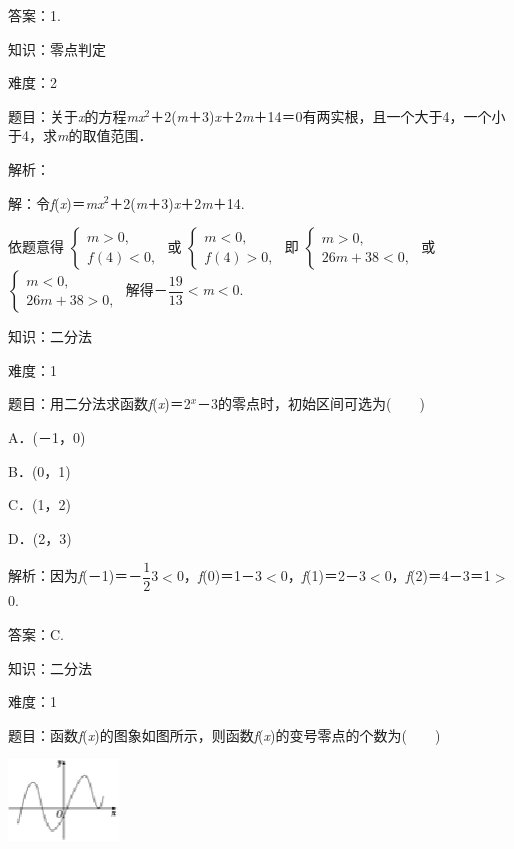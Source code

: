\documentclass{article} %
\begin{document}
答案：1.

知识：零点判定

难度：2

题目：关于\textit{x}的方程\textit{mx}${}^{2}$＋2(\textit{m}＋3)\textit{x}＋2\textit{m}＋14＝0有两实根，且一个大于4，一个小于4，求\textit{m}的取值范围．

解析：

解：令\textit{f}(\textit{x})＝\textit{mx}${}^{2}$＋2(\textit{m}＋3)\textit{x}＋2\textit{m}＋14.

依题意得
$\left\{
\begin{array}{l}
m>0,\\
f(4)<0,
\end{array}
\right.$
或
$\left\{
\begin{array}{l}
m<0,\\
f(4)>0,
\end{array}
\right.$
即
$\left\{
\begin{array}{l}
m>0,\\
26m+38<0,
\end{array}
\right.$
或
$\left\{
\begin{array}{l}
m<0,\\
26m+38>0,
\end{array}
\right.$
解得－$\dfrac{19}{13}$$\mathrm{<}$\textit{m}$\mathrm{<}$0.

知识：二分法

难度：1

题目：用二分法求函数\textit{f}(\textit{x})＝2\textit{${}^{x}$}－3的零点时，初始区间可选为(　　)

A．(－1，0)　　　　 

B．(0，1)

C．(1，2)   

D．(2，3)

解析：因为\textit{f}(－1)＝－$\dfrac{1}{2}$3$\mathrm{<}$0，\textit{f}(0)＝1－3$\mathrm{<}$0，\textit{f}(1)＝2－3$\mathrm{<}$0，\textit{f}(2)＝4－3＝1$\mathrm{>}$0.

答案：C.

知识：二分法

难度：1

题目：函数\textit{f}(\textit{x})的图象如图所示，则函数\textit{f}(\textit{x})的变号零点的个数为(　　)

\includegraphics*[width=1.16in, height=0.85in, keepaspectratio=false]{image71}
\end{document}

